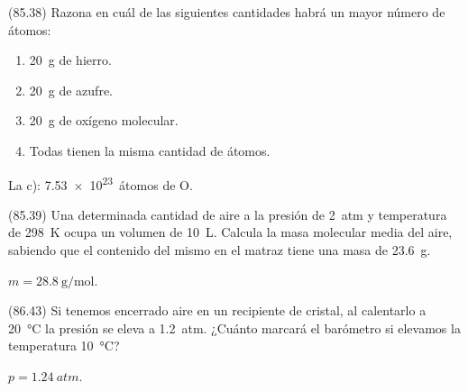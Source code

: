 \documentclass[10pt,a5paper,twoside]{article}
\begin{document}
  \begin{exercise}[
      tags    = {},
      topics  = {química,química básica},
      source  = {FQ 1B MGH 2016, p85, e38},
    ]
    (85.38) Razona en cuál de las siguientes cantidades habrá un mayor número de átomos:

    \begin{enumerate}
      \item \SI{20}{\gram} de hierro.
      \item \SI{20}{\gram} de azufre.
      \item \SI{20}{\gram} de oxígeno molecular.
      \item Todas tienen la misma cantidad de átomos.
    \end{enumerate}
  \end{exercise}

  \begin{solution}
    La c): \SI{7.53e23}{átomos} de O.
  \end{solution}




  \begin{exercise}[
      tags    = {},
      topics  = {química,química básica},
      source  = {FQ 1B MGH 2016, p85, e39},
    ]
    (85.39) Una determinada cantidad de aire a la presión de \SI{2}{atm} y
    temperatura de \SI{298}{\kelvin} ocupa un volumen de \SI{10}{\liter}. Calcula la masa molecular media del aire, sabiendo que el contenido del
    mismo en el matraz tiene una masa de \SI{23.6}{\gram}.
  \end{exercise}

  \begin{solution}
    \( m = \SI{28.8}{\gram\per\mole} \).
  \end{solution}




  \begin{exercise}[
      tags    = {},
      topics  = {química,química básica},
      source  = {FQ 1B MGH 2016, p86, e43},
    ]
    (86.43) Si tenemos encerrado aire en un recipiente de cristal, al
    calentarlo a \SI{20}{\celsius} la presión se eleva a \SI{1.2}{atm}. ¿Cuánto marcará el barómetro si elevamos la temperatura \SI{10}{\celsius}?
  \end{exercise}

  \begin{solution}
    \( p = \SI{1.24}{atm} \).
  \end{solution}
\end{document}
